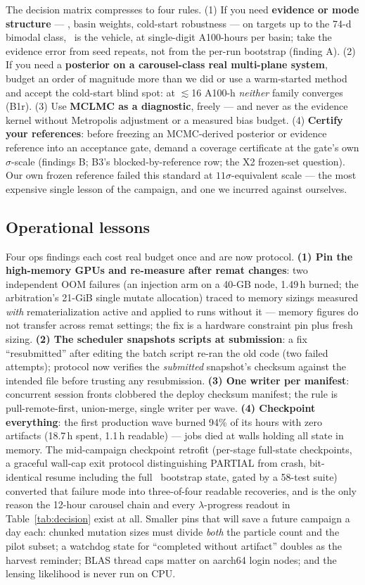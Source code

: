 The decision matrix compresses to four rules. (1) If you need {\bf
evidence or mode structure} --- \logZ, basin weights, cold-start
robustness --- on targets up to the 74-d bimodal class, \mcsmc\ is the
vehicle, at single-digit A100-hours per basin; take the evidence error
from seed repeats, not from the per-run bootstrap (finding A). (2) If you
need a {\bf posterior on a carousel-class real multi-plane system}, budget
an order of magnitude more than we did or use a warm-started method and
accept the cold-start blind spot: at $\lesssim$16 A100-h {\it neither}
family converges (B1r). (3) Use {\bf MCLMC as a diagnostic}, freely --- and
never as the evidence kernel without Metropolis adjustment or a measured
bias budget. (4) {\bf Certify your references}: before freezing an
MCMC-derived posterior or evidence reference into an acceptance gate,
demand a coverage certificate at the gate's own $\sigma$-scale (findings
B; B3's blocked-by-reference row; the X2 frozen-set question). Our own
frozen reference failed this standard at $11\sigma$-equivalent scale ---
the most expensive single lesson of the campaign, and one we incurred
against ourselves.

\subsection{Operational lessons}

Four ops findings each cost real budget once and are now protocol.
{\bf (1) Pin the high-memory GPUs and re-measure after remat changes}: two
independent OOM failures (an injection arm on a 40-GB node, 1.49\,h
burned; the arbitration's 21-GiB single mutate allocation) traced to
memory sizings measured {\it with} rematerialization active and applied to
runs without it --- memory figures do not transfer across remat settings;
the fix is a hardware constraint pin plus fresh sizing. {\bf (2) The
scheduler snapshots scripts at submission}: a fix ``resubmitted'' after
editing the batch script re-ran the old code (two failed attempts);
protocol now verifies the {\it submitted} snapshot's checksum against the
intended file before trusting any resubmission. {\bf (3) One writer per
manifest}: concurrent session fronts clobbered the deploy checksum
manifest; the rule is pull-remote-first, union-merge, single writer per
wave. {\bf (4) Checkpoint everything}: the first production wave burned
94\% of its hours with zero artifacts (18.7\,h spent, 1.1\,h readable) ---
jobs died at walls holding all state in memory. The mid-campaign
checkpoint retrofit (per-stage full-state checkpoints, a graceful
wall-cap exit protocol distinguishing PARTIAL from crash, bit-identical
resume including the full \logZ\ bootstrap state, gated by a 58-test
suite) converted that failure mode into three-of-four readable recoveries,
and is the only reason the 12-hour carousel chain and every
$\lambda$-progress readout in Table~\ref{tab:decision} exist at all.
Smaller pins that will save a future campaign a day each: chunked mutation
sizes must divide {\it both} the particle count and the pilot subset; a
watchdog state for ``completed without artifact'' doubles as the harvest
reminder; BLAS thread caps matter on aarch64 login nodes; and the lensing
likelihood is never run on CPU.


